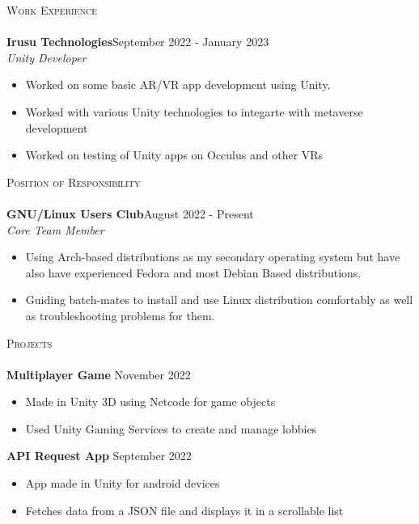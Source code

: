\documentclass[a4paper]{article}
\newcommand{\lineunder} {
    \vspace*{-8pt} \\
    \hspace*{-18pt} \hrulefill \\
}
\newcommand{\header} [1] {
    {\hspace*{-18pt}\vspace*{6pt} \textsc{#1}}
    \vspace*{-6pt} \lineunder
}
\begin{document}
\header{Work Experience}
\vspace{0mm}
\textbf{Irusu Technologies}\hfill September 2022 - January 2023\\
{\textit {Unity Developer}} 
\vspace{-2.5mm}
\begin{itemize} 
	\item Worked on some basic AR/VR app development using Unity.
 \vspace{-2.5mm}
        \item Worked with various Unity technologies to integarte with metaverse development
 \vspace{-2.5mm}
        \item Worked on testing of Unity apps on Occulus and other VRs
\end{itemize}

\vspace{1mm}

\header{Position of Responsibility}
\vspace{0mm}
\textbf{GNU/Linux Users Club}\hfill August 2022 - Present\\
{\textit {Core Team Member}}  
\vspace{-1mm}
\begin{itemize} 
	\item Using Arch-based distributions as my secondary operating system but have also have experienced Fedora and most Debian Based distributions.
        \item Guiding batch-mates to install and use Linux distribution comfortably as well as troubleshooting problems for them. 
\end{itemize}

\vspace{1mm}

\header{Projects}

{\textbf{Multiplayer Game}} \hfill November 2022
\vspace{-1mm}
\begin{itemize} 
	\item Made in Unity 3D using Netcode for game objects
        \item Used Unity Gaming Services to create and manage lobbies 
\end{itemize}

{\textbf{API Request App}} \hfill September 2022
\vspace{-1mm}
\begin{itemize} 
	\item App made in Unity for android devices
        \item Fetches data from a JSON file and displays it in a scrollable list
\end{itemize}
\end{document}
